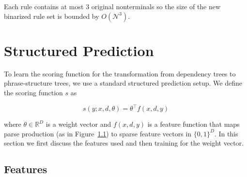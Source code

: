 \documentclass[11pt,letterpaper]{article}
\newcommand{\nonterms}{\mathcal{N}}
\newcommand{\Reals}{\mathbb{R}}
\begin{document}
\begin{center}
  \scalebox{0.6}{ \Tree [ .S NP VP$^*$ NP NP ] $\Rightarrow$ \Tree [
    .S NP [ .S$^{\Rightarrow*}$ [ .S$^{\Rightarrow*}_{NP}$ VP$^*$ NP ]
    NP ] ] }
\end{center}

\noindent Each rule contains at most 3 original nonterminals so the size of the new binarized rule set is bounded by $O(\nonterms^3)$.









\section{Structured Prediction}

To learn the scoring function for the transformation from dependency trees to phrase-structure trees,
we use a standard structured prediction setup.
We define the scoring function $s$ as

\[s(y;x, d, \theta) =  \theta^{\top} f(x, d, y) \]

\noindent
where $\theta \in \Reals^D $ is a weight vector  and $f(x, d, y)$ is a feature function that maps parse production (as in Figure~\ref{}) to sparse feature vectors in $\{0,1\}^D$. In this section we first discuss the features used and then training for the weight vector.


\subsection{Features}
\end{document}
